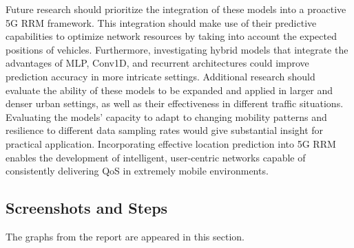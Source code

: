 \documentclass[journal,onecolumn]{IEEEtran}
\begin{document}
{Future research should prioritize the integration of these models into a proactive 5G RRM framework. This integration should make use of their predictive capabilities to optimize network resources by taking into account the expected positions of vehicles. Furthermore, investigating hybrid models that integrate the advantages of MLP, Conv1D, and recurrent architectures could improve prediction accuracy in more intricate settings. Additional research should evaluate the ability of these models to be expanded and applied in larger and denser urban settings, as well as their effectiveness in different traffic situations. Evaluating the models' capacity to adapt to changing mobility patterns and resilience to different data sampling rates would give substantial insight for practical application. Incorporating effective location prediction into 5G RRM enables the development of intelligent, user-centric networks capable of consistently delivering QoS in extremely mobile environments.
\clearpage

%  

\printbibliography %
\clearpage

\begin{appendices}

\section{Screenshots and Steps} \label{appendix-steps}
The graphs from the report are appeared in this section.


\end{appendices}}
\end{document}
